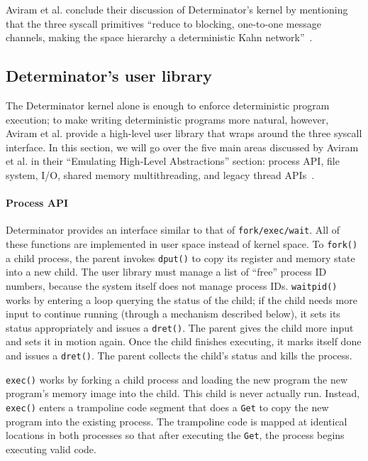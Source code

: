 Aviram et al. conclude their discussion of Determinator's kernel by mentioning
that the three syscall primitives ``reduce to blocking, one-to-one message
channels, making the space hierarchy a deterministic Kahn
network''~\cite{Aviram10,kahn1974semantics}.

\subsection{Determinator's user library}

The Determinator kernel alone is enough to enforce deterministic program
execution; to make writing deterministic programs more natural, however, Aviram
et al. provide a high-level user library that wraps around the three syscall
interface. In this section, we will go over
the five main areas discussed by Aviram et al. in their ``Emulating High-Level
Abstractions'' section: process API, file system, I/O, shared memory
multithreading, and legacy thread APIs~\cite{Aviram10}.

\paragraph{Process API}
Determinator provides an interface similar to that of {\tt fork/exec/wait}.
All of these functions are implemented in user space instead of kernel space.
To {\tt fork()} a child process, the parent invokes {\tt dput()} to copy its
register and memory state into a new child. The user library must manage a list
of ``free'' process ID numbers, because the system itself does not manage
process IDs. {\tt waitpid()}
works by entering a loop querying the status of the child; if the child needs
more input to continue running (through a mechanism described below), it
sets its status appropriately and issues a {\tt dret()}. The parent gives the
child more input and sets it in motion again. Once the child finishes executing,
it marks itself done and issues a {\tt dret()}. The parent collects the child's
status and kills the process.

{\tt exec()} works by forking a child process and loading the new program
the new program's memory image into the child. This child is never actually run.
Instead, {\tt exec()} enters a trampoline code segment that does a {\tt Get} to
copy the new program into the existing process. The trampoline code is mapped at
identical locations in both processes so that after executing the {\tt Get}, the
process begins executing valid code.

